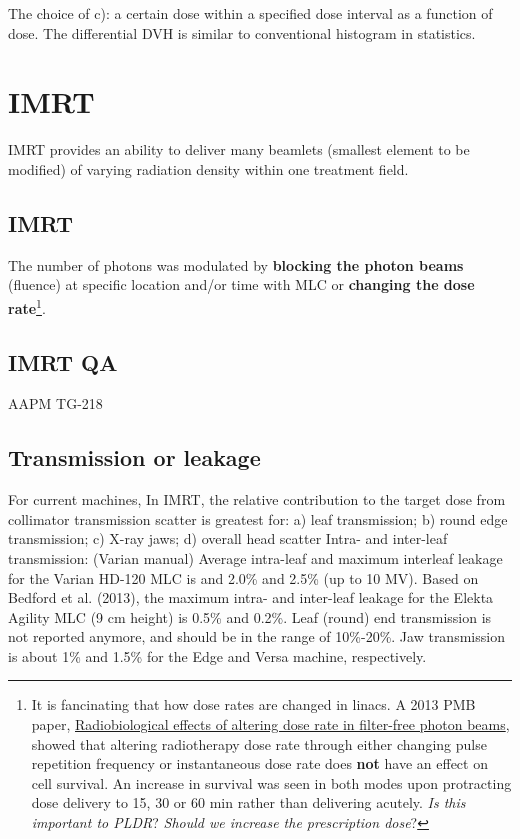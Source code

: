 \documentclass[]{book}
\let\rmarkdownfootnote\footnote%
\def\footnote{\protect\rmarkdownfootnote}
\theoremstyle{definition}
\theoremstyle{definition}
\theoremstyle{definition}
\theoremstyle{remark}
\begin{document}
The choice of c): a certain dose within a specified dose interval as a
function of dose. The differential DVH is similar to conventional
histogram in statistics.

\chapter{IMRT}\label{imrt}

IMRT provides an ability to deliver many beamlets (smallest element to
be modified) of varying radiation density within one treatment field.

\section{IMRT}\label{imrt}

The number of photons was modulated by \textbf{blocking the photon
beams} (fluence) at specific location and/or time with MLC or
\textbf{changing the dose rate}\footnote{It is fancinating that how dose
  rates are changed in linacs. A 2013 PMB paper,
  \href{http://iopscience.iop.org/article/10.1088/0031-9155/58/4/1075/meta}{Radiobiological
  effects of altering dose rate in filter-free photon beams}, showed
  that altering radiotherapy dose rate through either changing pulse
  repetition frequency or instantaneous dose rate does \textbf{not} have
  an effect on cell survival. An increase in survival was seen in both
  modes upon protracting dose delivery to 15, 30 or 60 min rather than
  delivering acutely. \emph{Is this important to PLDR}? \emph{Should we
  increase the prescription dose}?}.

\section{IMRT QA}\label{psqa}

AAPM TG-218

\section{Transmission or leakage}\label{transmission-or-leakage}

For current machines, In IMRT, the relative contribution to the target
dose from collimator transmission scatter is greatest for: a) leaf
transmission; b) round edge transmission; c) X-ray jaws; d) overall head
scatter Intra- and inter-leaf transmission: (Varian manual) Average
intra-leaf and maximum interleaf leakage for the Varian HD-120 MLC is
and 2.0\% and 2.5\% (up to 10 MV). Based on Bedford et al. (2013), the
maximum intra- and inter-leaf leakage for the Elekta Agility MLC (9 cm
height) is 0.5\% and 0.2\%. Leaf (round) end transmission is not
reported anymore, and should be in the range of 10\%-20\%. Jaw
transmission is about 1\% and 1.5\% for the Edge and Versa machine,
respectively.
\end{document}

